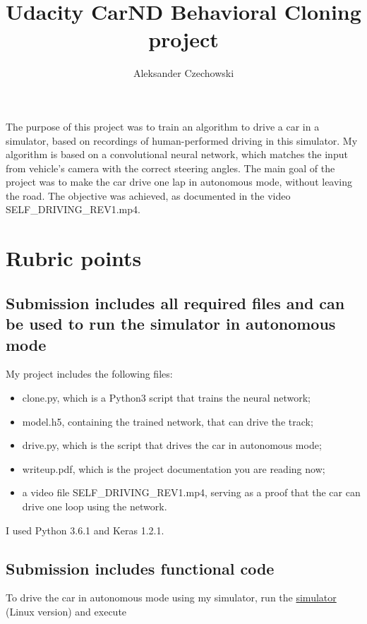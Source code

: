 \documentclass[a4paper,10pt]{article}
\begin{document}
\pagestyle{empty}
\noindent

\title{Udacity CarND Behavioral Cloning project}
\author{Aleksander Czechowski}
\maketitle

The purpose of this project was to train an algorithm to drive a car in a simulator,
based on recordings of human-performed driving in this simulator.
My algorithm is based on a convolutional neural network,
which matches the input from vehicle's camera with the correct steering angles.
The main goal of the project was to make the car drive one lap in autonomous mode, without leaving the road.
The objective was achieved, as documented in the video SELF\_DRIVING\_REV1.mp4.

\section{Rubric points}

\subsection{Submission includes all required files and can be used to run the simulator in autonomous mode}

My project includes the following files:

\begin{itemize}
  \item clone.py, which is a Python3 script that trains the neural network;
  \item model.h5, containing the trained network, that can drive the track;
  \item drive.py, which is the script that drives the car in autonomous mode;
  \item writeup.pdf, which is the project documentation you are reading now;
  \item a video file SELF\_DRIVING\_REV1.mp4, serving as a proof that the car can drive one loop using the network.
\end{itemize}
 
I used Python 3.6.1 and Keras 1.2.1.

\subsection{Submission includes functional code}

To drive the car in autonomous mode using my simulator,
run the \href{https://d17h27t6h515a5.cloudfront.net/topher/2017/February/58ae46bb_linux-sim/linux-sim.zip}{simulator} (Linux version)
and execute
\end{document}
